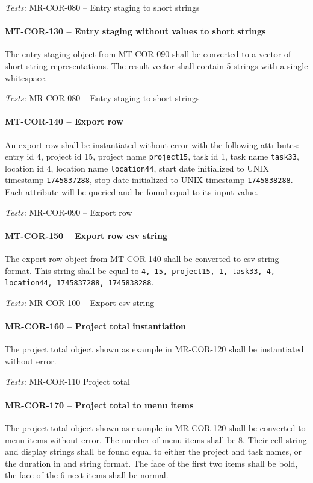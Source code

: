 \textit{Tests: } MR-COR-080 -- Entry staging to short strings

\paragraph{MT-COR-130 -- Entry staging without values to short strings}
The entry staging object from MT-COR-090 shall be converted to
a vector of short string representations. The result vector shall
contain 5 strings with a single whitespace.

\textit{Tests: } MR-COR-080 -- Entry staging to short strings

\paragraph{MT-COR-140 -- Export row}
An export row shall be instantiated without error with the following
attributes: entry id 4, project id 15, project name \lstinline{project15},
task id 1, task name \lstinline{task33}, location id 4, location name
\lstinline{location44}, start date initialized to UNIX timestamp
\lstinline{1745837288}, stop date initialized to UNIX timestamp
\lstinline{1745838288}.
Each attribute will be queried and be found equal to its input value.

\textit{Tests: } MR-COR-090 -- Export row

\paragraph{MT-COR-150 -- Export row csv string}
The export row object from MT-COR-140 shall be converted to csv string
format. This string shall be equal to
\lstinline{4, 15, project15, 1, task33, 4, location44, 1745837288, 1745838288}.

\textit{Tests: } MR-COR-100 -- Export csv string

\paragraph{MR-COR-160 -- Project total instantiation}
The project total object shown as example in MR-COR-120 shall
be instantiated without error.

\textit{Tests: } MR-COR-110 Project total

\paragraph{MR-COR-170 -- Project total to menu items}
The project total object shown as example in MR-COR-120 shall
be converted to menu items without error.
The number of menu items shall be 8.
Their cell string and display strings shall be found equal
to either the project and task names, or the duration in
and string format. The face of the first two items shall
be bold, the face of the 6 next items shall be normal.

